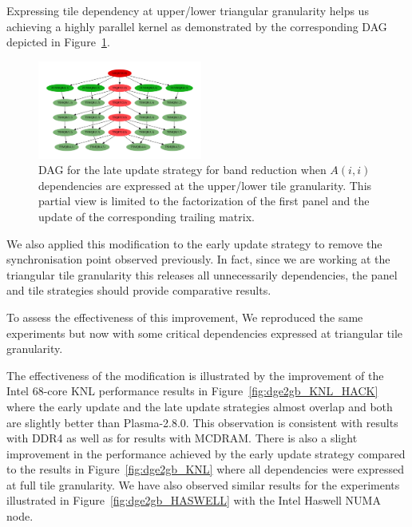 Expressing tile dependency at upper/lower triangular
granularity helps us achieving a highly parallel kernel as
demonstrated by the corresponding DAG depicted in Figure~\ref{fig:dag_hack}.
\begin{figure}
  \begin{center}
    \includegraphics[width=0.48\textwidth]{fig/dag_better}
  \end{center}
  \caption{DAG for the late update strategy for band reduction when
      $A(i,i)$ dependencies are expressed at the upper/lower tile
      granularity. This partial view is limited to the factorization of the
      first panel and the update of the corresponding trailing matrix.}
  \label{fig:dag_hack}
\end{figure}

We also applied this modification to the early update strategy
to remove the synchronisation point observed previously.
In fact, since we are working at the triangular tile granularity this
releases all unnecessarily dependencies,
the panel and tile strategies should provide comparative results.

To assess the effectiveness of this improvement,
We reproduced the same experiments but now with
some critical dependencies expressed at triangular
tile granularity.

The effectiveness of the modification is illustrated by
the improvement of the Intel 68-core KNL performance
results in Figure~\ref{fig:dge2gb_KNL_HACK} where
the early update and the late update strategies
almost overlap and both are slightly better than Plasma-2.8.0.
This observation is consistent with results with DDR4 as well as
for results with MCDRAM.
There is also a slight improvement in the
performance achieved by the early update strategy
compared to the results in Figure~\ref{fig:dge2gb_KNL} where all dependencies
were expressed at full tile granularity.
We have also observed similar results for the experiments
illustrated in Figure~\ref{fig:dge2gb_HASWELL} with the Intel Haswell NUMA node.


